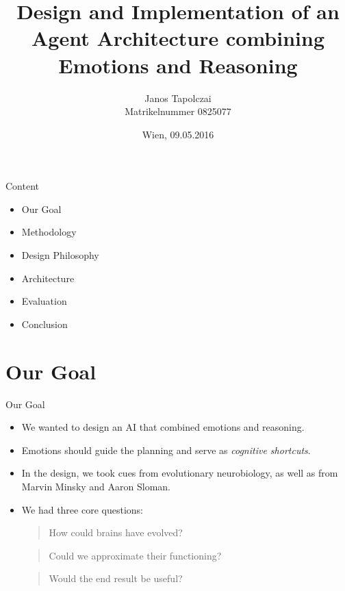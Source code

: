 \documentclass{beamer}
\title{Design and Implementation of an Agent Architecture combining Emotions and Reasoning}
\author{Janos Tapolczai\\ Matrikelnummer 0825077}
\date{Wien, 09.05.2016}
\begin{document}
   
   \begin{frame}
      \titlepage
   \end{frame}
   
   \begin{frame}{Content}
      \begin{itemize}
         \item Our Goal
         \item Methodology
         \item Design Philosophy
         \item Architecture
         \item Evaluation
         \item Conclusion
      \end{itemize}
   \end{frame}
   
   \section{Our Goal}

   \begin{frame}{Our Goal}
      \begin{itemize}
         \item We wanted to design an AI that combined emotions and reasoning.
         \item Emotions should guide the planning and serve as \emph{cognitive shortcuts}.
         
         \item In the design, we took cues from evolutionary neurobiology, as well as from Marvin Minsky and Aaron Sloman.
         
         \item We had three core questions:
         
         \begin{quotation}
            How could brains have evolved?
         \end{quotation}
         
         \begin{quotation}
            Could we approximate their functioning?
         \end{quotation}
         
         \begin{quotation}
            Would the end result be useful?
         \end{quotation}
      \end{itemize}
   \end{frame}
   
\end{document}
